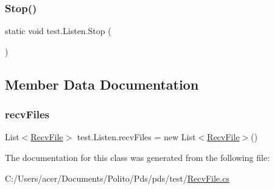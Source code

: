 \subsubsection{\texorpdfstring{Stop()}{Stop()}}
{\footnotesize\ttfamily static void test.\+Listen.\+Stop (\begin{DoxyParamCaption}{ }\end{DoxyParamCaption})\hspace{0.3cm}{\ttfamily [static]}}



\subsection{Member Data Documentation}
\mbox{\label{classtest_1_1_listen_ad800e778afc90df8e0c164bc68dfc7b4}} 
\subsubsection{\texorpdfstring{recv\+Files}{recvFiles}}
{\footnotesize\ttfamily List$<$\hyperlink{classtest_1_1_recv_file}{Recv\+File}$>$ test.\+Listen.\+recv\+Files = new List$<$\hyperlink{classtest_1_1_recv_file}{Recv\+File}$>$()\hspace{0.3cm}{\ttfamily [static]}}



The documentation for this class was generated from the following file\+:\begin{DoxyCompactItemize}
\item 
C\+:/\+Users/acer/\+Documents/\+Polito/\+Pds/pds/test/\hyperlink{_recv_file_8cs}{Recv\+File.\+cs}\end{DoxyCompactItemize}
